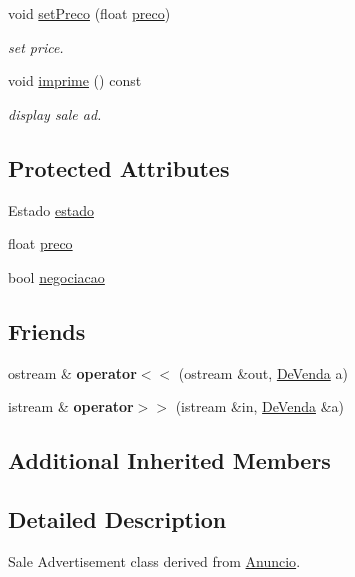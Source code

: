 \begin{DoxyCompactItemize}
void \hyperlink{class_de_venda_a964e74c6176f62250dbc37c3b1ba4698}{set\+Preco} (float \hyperlink{class_de_venda_a2e2c3efbd50a6778965e5383267c261a}{preco})
\begin{DoxyCompactList}\small\item\em set price. \end{DoxyCompactList}\item 
void \hyperlink{class_de_venda_af1c5b76d122e55e8a05e365b5c1bfd90}{imprime} () const 
\begin{DoxyCompactList}\small\item\em display sale ad. \end{DoxyCompactList}\end{DoxyCompactItemize}
\subsection*{Protected Attributes}
\begin{DoxyCompactItemize}
\item 
Estado \hyperlink{class_de_venda_a54648a4106f60e954441a6e121da8b81}{estado}
\item 
float \hyperlink{class_de_venda_a2e2c3efbd50a6778965e5383267c261a}{preco}
\item 
bool \hyperlink{class_de_venda_a45c4aa9333658f4b59c91dcaf22a0496}{negociacao}
\end{DoxyCompactItemize}
\subsection*{Friends}
\begin{DoxyCompactItemize}
\item 
\hypertarget{class_de_venda_a9105bc409c4772abd8f320b90823a302}{}ostream \& {\bfseries operator$<$$<$} (ostream \&out, \hyperlink{class_de_venda}{De\+Venda} a)\label{class_de_venda_a9105bc409c4772abd8f320b90823a302}

\item 
\hypertarget{class_de_venda_a86a435d5400e4b3ea57830a605ede83e}{}istream \& {\bfseries operator$>$$>$} (istream \&in, \hyperlink{class_de_venda}{De\+Venda} \&a)\label{class_de_venda_a86a435d5400e4b3ea57830a605ede83e}

\end{DoxyCompactItemize}
\subsection*{Additional Inherited Members}


\subsection{Detailed Description}
Sale Advertisement class derived from \hyperlink{class_anuncio}{Anuncio}. 

